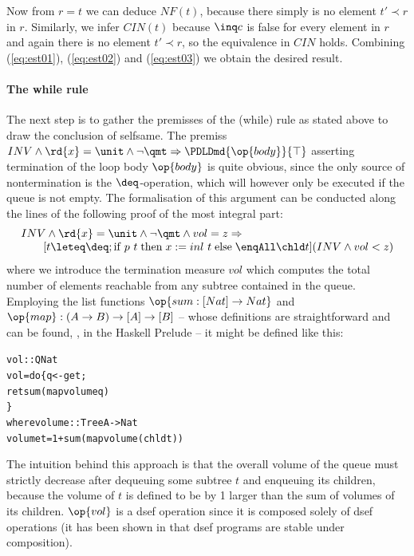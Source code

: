 Now from $r = t$ we can deduce $NF(t)$, because there simply is no element $t' \prec
r$ in $r$. Similarly, we infer $CIN(t)$ because $\inq c$ is false for every
element in $r$ and again there is no element $t' \prec r$, so the equivalence in
$CIN$ holds.  Combining (\ref{eq:est01}), (\ref{eq:est02}) and (\ref{eq:est03})
we obtain the desired result.

\paragraph{The while rule}
The next step is to gather the premisses of the (while) rule as stated above to
draw the conclusion of selfsame. The premiss $INV \land \rd{x} = \unit \land \lnot \qmt \Rightarrow
\PDLDmd{\op{body}}{\top}$ asserting termination of the loop body $\op{body}$ is
quite obvious, since the only source of nontermination is the $\deq$-operation,
which will however only be executed if the queue is not empty. The formalisation
of this argument can be conducted along the lines of the following proof of the
most integral part:
\begin{equation}
\label{eq:prem-while}
\begin{array}{l}
INV \land \rd{x} = \unit \land \lnot \qmt \land vol = z \Rightarrow \\
 \qquad 
   [t \leteq \deq; \mathrm{if}\; p\ t\; \mathrm{then}\; x := inl\ t \;
   \mathrm{else}\; \enqAll \chld
t](INV \land vol < z)
\end{array}
\end{equation}
where we introduce the termination measure $vol$ which computes the total number
of elements reachable from any subtree contained in the queue. Employing the
list functions $\op{sum : [Nat] \to Nat}$ and $\op{map} : (A \to B) \to [A] \to [B]$ --
whose definitions are straightforward and can be found, \EG, in the Haskell
Prelude -- it might be defined like this:
\begin{alltt}
vol :: Q Nat
vol = do \{ q <- get; 
           ret sum (map volume q) 
         \}
    where volume :: Tree A -> Nat
          volume t = 1 + sum (map volume (chld t))
\end{alltt}
The intuition behind this approach is that the overall volume of the queue must
strictly decrease after dequeuing some subtree $t$ and enqueuing its children,
because the volume of $t$ is defined to be by 1 larger than the sum of volumes
of its children. $\op{vol}$ is a dsef operation since it is composed solely of
dsef operations (it has been shown in \Isabelle that dsef programs are stable
under composition).


